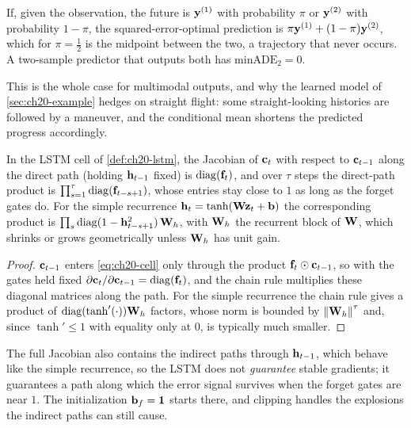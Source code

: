 \begin{corollary}
\label{thm:ch20-mode-averaging}
If, given the observation, the future is $\mathbf{y}^{(1)}$ with probability
$\pi$ or $\mathbf{y}^{(2)}$ with probability $1 - \pi$, the squared-error-optimal
prediction is $\pi\mathbf{y}^{(1)} + (1 - \pi)\mathbf{y}^{(2)}$, which for $\pi =
\tfrac12$ is the midpoint between the two, a trajectory that never occurs. A
two-sample predictor that outputs both has $\mathrm{minADE}_2 = 0$.
\end{corollary}

This is the whole case for multimodal outputs, and why the learned model of
\cref{sec:ch20-example} hedges on straight flight: some straight-looking
histories are followed by a maneuver, and the conditional mean shortens the
predicted progress accordingly.

\begin{proposition}
\label{thm:ch20-carousel}
In the LSTM cell of \cref{def:ch20-lstm}, the Jacobian of $\mathbf{c}_t$ with
respect to $\mathbf{c}_{t-1}$ along the direct path (holding $\mathbf{h}_{t-1}$
fixed) is $\operatorname{diag}(\mathbf{f}_t)$, and over $\tau$ steps the direct-path product is
$\prod_{s=1}^{\tau}\operatorname{diag}(\mathbf{f}_{t-s+1})$, whose entries stay close to $1$ as
long as the forget gates do. For the simple recurrence $\mathbf{h}_t =
\tanh(\mathbf{W}\mathbf{z}_t + \mathbf{b})$ the corresponding product is $\prod_s
\operatorname{diag}(1 - \mathbf{h}_{t-s+1}^{2})\,\mathbf{W}_h$, with $\mathbf{W}_h$ the recurrent block
of $\mathbf{W}$, which shrinks or grows geometrically unless $\mathbf{W}_h$ has unit
gain.
\end{proposition}
\begin{proof}
$\mathbf{c}_{t-1}$ enters \cref{eq:ch20-cell} only through the product
$\mathbf{f}_t \odot \mathbf{c}_{t-1}$, so with the gates held fixed
$\partial\mathbf{c}_t/\partial\mathbf{c}_{t-1} = \operatorname{diag}(\mathbf{f}_t)$, and the chain
rule multiplies these diagonal matrices along the path. For the simple
recurrence the chain rule gives a product of $\operatorname{diag}(\tanh'(\cdot))\mathbf{W}_h$
factors, whose norm is bounded by $\left\lVert \mathbf{W}_h \right\rVert^\tau$ and, since
$\tanh' \le 1$ with equality only at $0$, is typically much smaller.
\end{proof}

The full Jacobian also contains the indirect paths through $\mathbf{h}_{t-1}$,
which behave like the simple recurrence, so the LSTM does not
\emph{guarantee} stable gradients; it guarantees a path along which the error
signal survives when the forget gates are near $1$. The initialization
$\mathbf{b}_f = \mathbf{1}$ starts there, and clipping handles the explosions the
indirect paths can still cause.

